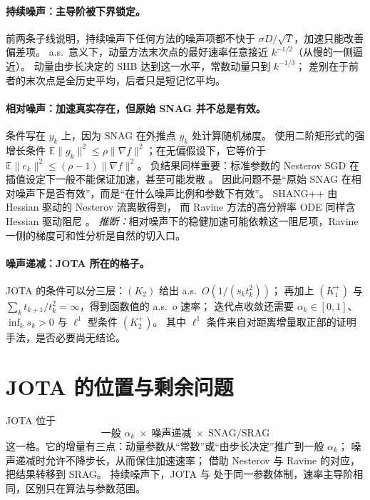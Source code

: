 \documentclass[11pt]{ctexart}
\begin{document}
\paragraph{持续噪声：主导阶被下界锁定。}
前两条子线说明，持续噪声下任何方法的噪声项都不快于 $\sigma D/\sqrt T$，加速只能改善偏差项。
a.s.\ 意义下，动量方法末次点的最好速率任意接近 $k^{-1/2}$（从慢的一侧逼近）。
动量由步长决定的 SHB 达到这一水平，常数动量只到 $k^{-1/3}$；
差别在于前者的末次点是全历史平均，后者只是短记忆平均。

\paragraph{相对噪声：加速真实存在，但原始 SNAG 并不总是有效。}
条件写在 $y_k$ 上，因为 SNAG 在外推点 $y_k$ 处计算随机梯度。
\citet{vaswani2019fast} 使用二阶矩形式的强增长条件
$\mathbb E\|g_k\|^2\le\rho\|\nabla f\|^2$；在无偏假设下，它等价于
$\mathbb E\|e_k\|^2\le(\rho-1)\|\nabla f\|^2$。
负结果同样重要：标准参数的 Nesterov SGD 在插值设定下一般不能保证加速，甚至可能发散
\citep{kidambi2018insufficiency,liu2020accelerating}。
因此问题不是“原始 SNAG 在相对噪声下是否有效”，而是“在什么噪声比例和参数下有效”。
SHANG++ \citep{yu2026shang} 由 Hessian 驱动的 Nesterov 流离散得到，
而 Ravine 方法的高分辨率 ODE 同样含 Hessian 驱动阻尼 \citep{attouch2026ravine}。
\emph{推断：}相对噪声下的稳健加速可能依赖这一阻尼项，Ravine 一侧的梯度可和性分析是自然的切入口。

\paragraph{噪声递减：JOTA 所在的格子。}
JOTA 的条件可以分三层：$(K_2)$ 给出 a.s.\ $O(1/(s_kt_k^2))$；
再加上 $(K_1^+)$ 与 $\sum_k t_{k+1}/t_k^2=\infty$，得到函数值的 a.s.\ $o$ 速率；
迭代点收敛还需要 $\alpha_k\in[0,1]$、$\inf_k s_k>0$ 与 $\ell^1$ 型条件 $(K_2^+)$。
其中 $\ell^1$ 条件来自对距离增量取正部的证明手法，是否必要尚无结论。

\section{JOTA 的位置与剩余问题}

JOTA 位于
\[
  \text{一般 }\alpha_k\;\times\;\text{噪声递减}\;\times\;\text{SNAG/SRAG}
\]
这一格。它的增量有三点：动量参数从“常数”或“由步长决定”推广到一般 $\alpha_k$；
噪声递减时允许不降步长，从而保住加速速率；
借助 Nesterov 与 Ravine 的对应，把结果转移到 SRAG。
持续噪声下，JOTA 与 \citet{sebbouh2021} 处于同一参数体制，速率主导阶相同，区别只在算法与参数范围。
\end{document}
